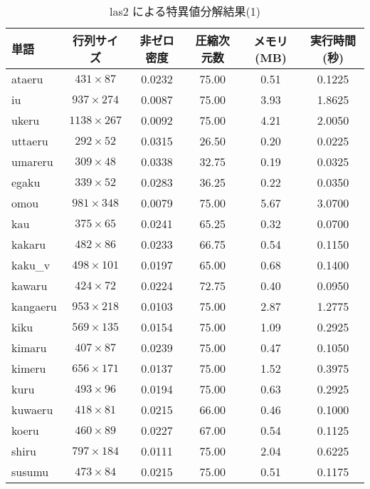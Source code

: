\begin{table}[ht]
\scriptsize
  \begin{center}
    \leavevmode
    \caption{las2 による特異値分解結果(1)}
    \begin{tabular}{|p{}|c|c|c|c|c|} \hline
単語  &  行列サイズ &  非ゼロ密度 &  圧縮次元数 &   メモリ(MB) & 実行時間(秒) \\ \hline
ataeru & \( 431 \times 87 \) & 0.0232    & 75.00 & 0.51   & 0.1225   \\
iu & \( 937 \times 274 \) & 0.0087       & 75.00 & 3.93   & 1.8625   \\
ukeru & \( 1138 \times 267 \) & 0.0092   & 75.00 & 4.21   & 2.0050   \\
uttaeru & \( 292 \times 52 \) & 0.0315   & 26.50 & 0.20   & 0.0225   \\
umareru & \( 309 \times 48 \) & 0.0338   & 32.75 & 0.19   & 0.0325   \\
egaku & \( 339 \times 52 \) & 0.0283     & 36.25 & 0.22   & 0.0350   \\
omou & \( 981 \times 348 \) & 0.0079     & 75.00 & 5.67   & 3.0700   \\
kau & \( 375 \times 65 \)   & 0.0241     & 65.25 & 0.32   & 0.0700   \\
kakaru & \( 482 \times 86 \) & 0.0233    & 66.75 & 0.54   & 0.1150   \\
kaku\_v & \( 498 \times 101 \) & 0.0197  & 65.00 & 0.68   & 0.1400   \\
kawaru & \( 424 \times 72 \) & 0.0224    & 72.75 & 0.40   & 0.0950    \\
kangaeru & \( 953 \times 218 \) & 0.0103 & 75.00 & 2.87   & 1.2775   \\
kiku & \( 569 \times 135 \) & 0.0154     & 75.00 & 1.09   & 0.2925   \\
kimaru & \( 407 \times 87 \) & 0.0239    & 75.00 & 0.47   & 0.1050   \\
kimeru & \( 656 \times 171 \) & 0.0137   & 75.00 & 1.52   & 0.3975   \\
kuru & \( 493 \times 96 \) & 0.0194      & 75.00 & 0.63   & 0.2925   \\
kuwaeru & \( 418 \times 81 \) & 0.0215   & 66.00 & 0.46   & 0.1000   \\
koeru & \( 460 \times 89 \) & 0.0227     & 67.00 & 0.54   & 0.1125   \\
shiru & \( 797 \times 184 \) & 0.0111    & 75.00 & 2.04   & 0.6225    \\
susumu & \( 473 \times 84 \) & 0.0215    & 75.00 & 0.51   & 0.1175    \\

\end{tabular}
\end{center}
\end{table}
